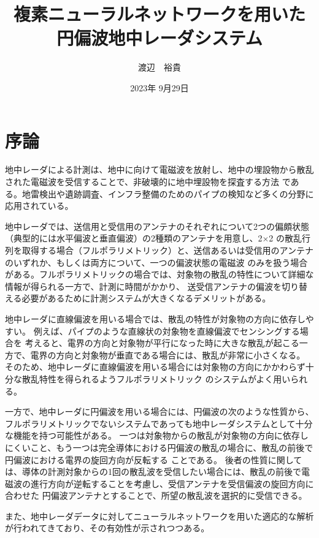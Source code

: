 \documentclass[11pt,a4paper,uplatex,draft]{ujarticle}
\title{複素ニューラルネットワークを用いた\\円偏波地中レーダシステム}
\date{2023年 9月29日}
\author{渡辺　裕貴}
\begin{document}
\maketitle
\newpage
\tableofcontents
\newpage
\section{序論}

  地中レーダによる計測は、地中に向けて電磁波を放射し、地中の埋設物から散乱された電磁波を受信することで、非破壊的に地中埋設物を探査する方法
  である。地雷検出や遺跡調査、インフラ整備のためのパイプの検知など多くの分野に応用されている\cite{landmine_example}\cite{remains_example}。

  地中レーダでは、送信用と受信用のアンテナのそれぞれについて2つの偏頗状態（典型的には水平偏波と垂直偏波）の2種類のアンテナを用意し、2$\times$2
  の散乱行列を取得する場合（フルポラリメトリック）と、送信あるいは受信用のアンテナのいずれか、もしくは両方について、一つの偏波状態の電磁波
  のみを扱う場合がある。フルポラリメトリックの場合では、対象物の散乱の特性について詳細な情報が得られる一方で、計測に時間がかかり、
  送受信アンテナの偏波を切り替える必要があるために計測システムが大きくなるデメリットがある。

  地中レーダに直線偏波を用いる場合では、散乱の特性が対象物の方向に依存しやすい。
  例えば、パイプのような直線状の対象物を直線偏波でセンシングする場合を
  考えると、電界の方向と対象物が平行になった時に大きな散乱が起こる一方で、電界の方向と対象物が垂直である場合には、散乱が非常に小さくなる。
  そのため、地中レーダに直線偏波を用いる場合には対象物の方向にかかわらず十分な散乱特性を得られるようフルポラリメトリック
  のシステムがよく用いられる。
  
  一方で、地中レーダに円偏波を用いる場合には、円偏波の次のような性質から、フルポラリメトリックでないシステムであっても地中レーダシステムとして十分な機能を持つ可能性がある。
  一つは対象物からの散乱が対象物の方向に依存しにくいこと、もう一つは完全導体における円偏波の散乱の場合に、散乱の前後で円偏波における電界の旋回方向が反転する
  ことである。
  後者の性質に関しては、導体の計測対象からの1回の散乱波を受信したい場合には、散乱の前後で電磁波の進行方向が逆転することを考慮し、受信アンテナを受信偏波の旋回方向に合わせた
  円偏波アンテナとすることで、所望の散乱波を選択的に受信できる。

  また、地中レーダデータに対してニューラルネットワークを用いた適応的な解析が行われてきており、その有効性が示されつつある\cite{landmine_CNN}\cite{hidden_Markov}。
\end{document}
